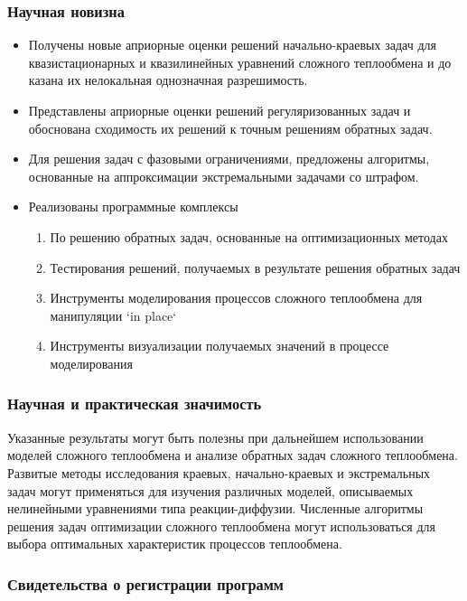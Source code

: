\begin{frame}
    \frametitle{Научная новизна}
    \begin{itemize}
        \item Получены новые априорные оценки решений начально-краевых задач для
        квазистационарных и квазилинейных уравнений сложного теплообмена и до
        казана их нелокальная однозначная разрешимость.
        \item Представлены априорные
        оценки решений регуляризованных задач и обоснована сходимость их решений к
        точным решениям обратных задач.
        \item Для решения задач с фазовыми ограничениями,
        предложены алгоритмы, основанные на аппроксимации экстремальными
        задачами со штрафом.
        \item Реализованы программные комплексы
        \begin{enumerate}
            \item По решению обратных задач, основанные на оптимизационных методах
            \item Тестирования решений, получаемых в результате решения обратных задач
            \item Инструменты моделирования процессов сложного теплообмена для манипуляции `in place`
            \item Инструменты визуализации получаемых значений в процессе моделирования
        \end{enumerate}
    \end{itemize}
\end{frame}


\begin{frame}
    \frametitle{Научная и практическая значимость}
    Указанные результаты могут быть полезны при дальнейшем использовании моделей
    сложного теплообмена и анализе обратных задач сложного теплообмена.
    Развитые методы исследования краевых,
    начально-краевых и экстремальных задач могут применяться для изучения различных моделей,
    описываемых нелинейными уравнениями типа
    реакции-диффузии.
    Численные алгоритмы решения задач оптимизации
    сложного теплообмена могут использоваться для выбора оптимальных
    характеристик процессов теплообмена.
\end{frame}


\begin{frame}
    \frametitle{Свидетельства о регистрации программ}
    \begin{minipage}[t]{0.3\linewidth}
    \end{minipage}
    \hfill
    \begin{minipage}[t]{0.3\linewidth}
    \end{minipage}
    \hfill
    \begin{minipage}[t]{0.3\linewidth}
    \end{minipage}
\end{frame}


